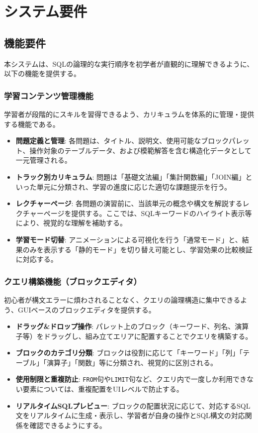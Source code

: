 \documentclass[uplatex,a4paper,12pt]{ujreport}
\begin{document}
\section{システム要件}
\subsection{機能要件}
本システムは、SQLの論理的な実行順序を初学者が直観的に理解できるように、以下の機能を提供する。
\subsubsection{学習コンテンツ管理機能}
学習者が段階的にスキルを習得できるよう、カリキュラムを体系的に管理・提供する機能である。
\begin{itemize}
  \item \textbf{問題定義と管理}: 各問題は、タイトル、説明文、使用可能なブロックパレット、操作対象のテーブルデータ、および模範解答を含む構造化データとして一元管理される。
  \item \textbf{トラック別カリキュラム}: 問題は「基礎文法編」「集計関数編」「JOIN編」といった単元に分類され、学習の進度に応じた適切な課題提示を行う。
  \item \textbf{レクチャーページ}: 各問題の演習前に、当該単元の概念や構文を解説するレクチャーページを提供する。ここでは、SQLキーワードのハイライト表示等により、視覚的な理解を補助する。
  \item \textbf{学習モード切替}: アニメーションによる可視化を行う「通常モード」と、結果のみを表示する「静的モード」を切り替え可能とし、学習効果の比較検証に対応する。
\end{itemize}
\subsubsection{クエリ構築機能（ブロックエディタ）}
初心者が構文エラーに煩わされることなく、クエリの論理構造に集中できるよう、GUIベースのブロックエディタを提供する。
\begin{itemize}
  \item \textbf{ドラッグ\&ドロップ操作}: パレット上のブロック（キーワード、列名、演算子等）をドラッグし、組み立てエリアに配置することでクエリを構築する。
  \item \textbf{ブロックのカテゴリ分類}: ブロックは役割に応じて「キーワード」「列」「テーブル」「演算子」「関数」等に分類され、視覚的に区別される。
  \item \textbf{使用制限と重複防止}: \texttt{FROM}句や\texttt{LIMIT}句など、クエリ内で一度しか利用できない要素については、重複配置をUIレベルで防止する。
  \item \textbf{リアルタイムSQLプレビュー}: ブロックの配置状況に応じて、対応するSQL文をリアルタイムに生成・表示し、学習者が自身の操作とSQL構文の対応関係を確認できるようにする。
\end{itemize}
\end{document}
